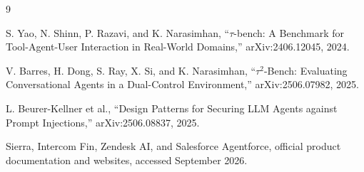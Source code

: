 \documentclass[11pt,a4paper]{article}
\begin{document}
\begingroup
\footnotesize
\setlength{\parskip}{0pt}

\begin{thebibliography}{9}
\setlength{\itemsep}{1pt}
\setlength{\parsep}{0pt}

S. Yao, N. Shinn, P. Razavi, and K. Narasimhan,
``$\tau$-bench: A Benchmark for Tool-Agent-User Interaction in Real-World Domains,''
arXiv:2406.12045, 2024.

V. Barres, H. Dong, S. Ray, X. Si, and K. Narasimhan,
``$\tau^2$-Bench: Evaluating Conversational Agents in a Dual-Control Environment,''
arXiv:2506.07982, 2025.

L. Beurer-Kellner et al.,
``Design Patterns for Securing LLM Agents against Prompt Injections,''
arXiv:2506.08837, 2025.

Sierra, Intercom Fin, Zendesk AI, and Salesforce Agentforce,
official product documentation and websites, accessed September 2026.

\end{thebibliography}
\endgroup
\end{document}
